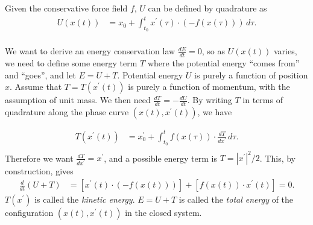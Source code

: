 \documentclass[11pt,a4paper]{memoir}
\newcommand{\pr}{\prime}
\begin{document}
Given the conservative force field $f$, $U$ can be defined by quadrature as
\begin{equation}
\begin{split}
    U(x(t)) &= x_0 + \int_{t_0}^t x^\pr(\tau) \cdot(-f(x(\tau)))\, d\tau. \\
\end{split}
\end{equation}

We want to derive an energy conservation law $\frac{dE}{dt} = 0$, so as $U(x(t))$ varies, we need to define
some energy term $T$ where the potential energy ``comes from'' and ``goes'', and let $E = U + T$.
Potential energy $U$ is purely a function of position $x$. Assume that $T = T(x^\pr(t))$ is purely a function of momentum, with the assumption of unit mass.
We then need $\frac{dT}{dt} = -\frac{dU}{dt}$. By writing $T$ in terms of quadrature along the phase curve $(x(t),x^\pr(t))$, we have

\begin{equation}
\begin{split}
    T(x^\pr(t)) &= x_0^\pr + \int_{t_0}^t f(x(\tau)) \cdot \frac{dT}{dx^\pr}\, d\tau. \\
\end{split}
\end{equation}
Therefore we want $\frac{dT}{dx^\pr} = x^\pr$, and a possible energy term is $T = |x^\pr|^2/2$.
This, by construction, gives
\begin{equation}
\begin{split}
    \frac{d}{dt}\left(U + T\right) &= \left[x^\pr(t)\cdot (-f(x(t)))\right] + \left[f(x(t))\cdot x^\pr(t)\right] = 0.
\end{split}
\end{equation}
$T(x^\pr)$ is called the \textit{kinetic energy}. $E = U + T$ is called the \textit{total energy} of the configuration $(x(t), x^\pr(t))$ in the closed system.
\end{document}
